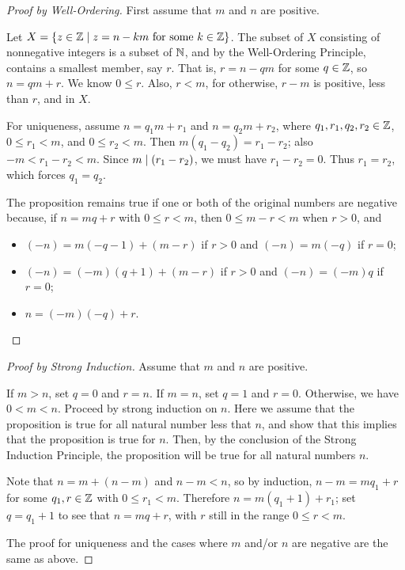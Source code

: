 \documentclass{amsart}
\begin{document}
\begin{proof}[Proof by Well-Ordering]
First assume that $m$ and $n$ are positive.

Let $X = \{ z \in \mathbb{Z} \mid z = n - km \text{ for some } k \in \mathbb{Z}
\}$. The subset of $X$ consisting of nonnegative integers is a
subset of $\mathbb{N}$, and by the Well-Ordering Principle, contains a
smallest member, say $r$.  That is, $r = n - qm$ for some $q \in
\mathbb{Z}$, so $n = qm + r$. We know $0 \le r$.  Also, $r < m$, for
otherwise, $r - m$ is positive, less than $r$, and in $X$.

For uniqueness, assume $n = q_{1}m + r_{1}$ and $n = q_{2} m +
r_{2}$, where $q_{1},r_{1},q_{2},r_{2} \in \mathbb{Z}$, $0 \le r_{1} <
m$, and $0 \le r_{2} < m$. Then $m(q_{1}-q_{2}) = r_{1}-r_{2}$;
also $-m < r_{1}-r_{2} < m$. Since $m \mid (r_{1}-r_{2})$, we
must have $r_{1} - r_{2} = 0$. Thus $r_{1} = r_{2}$, which forces
$q_{1} = q_{2}$.

The proposition remains true if one or both of the original
numbers are negative because, if $n = mq+r$ with $0 \le r < m$,
then $0 \le m-r < m$ when $r>0$, and
\begin{itemize}
\item $(-n) = m(-q-1) + (m-r)$ if $r>0$ and $(-n) = m(-q)$ if $r =
0$; \item $(-n) = (-m)(q+1) + (m-r)$ if $r > 0$ and $(-n) = (-m)q$
if $r = 0$; \item $n = (-m)(-q) + r$.
\end{itemize}
\end{proof}

\begin{proof}[Proof by Strong Induction]
Assume that $m$ and $n$ are positive.

If $m > n$, set $q=0$ and $r=n$. If $m = n$, set $q = 1$ and $r = 0$.
Otherwise, we have $0 < m < n$.
Proceed by strong induction on $n$. Here we assume that the
proposition is true for all natural number less that $n$, and show
that this implies that the proposition is true for $n$.  Then, by
the conclusion of the Strong Induction Principle, the proposition
will be true for all natural numbers $n$.

Note that $n = m + (n-m)$ and $n-m < n$, so by induction, $n-m =
mq_1 + r$ for some $q_1,r \in \mathbb{Z}$ with $0 \le r_1 < m$.
Therefore $n = m(q_1 + 1) + r_1$; set $q = q_1 + 1$ to see that $n
= mq + r$, with $r$ still in the range $0 \le r < m$.

The proof for uniqueness and the cases where $m$ and/or $n$ are
negative are the same as above.
\end{proof}
\end{document}
